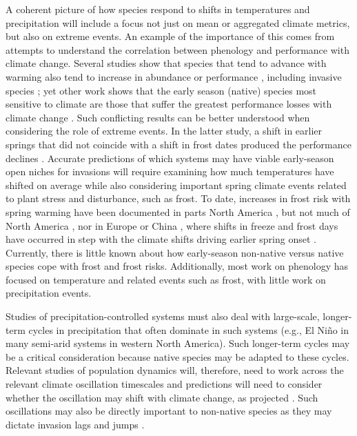 \documentclass[11pt,a4paper,oneside]{article}
\begin{document}
A coherent picture of how species respond to shifts in temperatures and precipitation will include a focus not just on mean or aggregated climate metrics, but also on extreme events. An example of the importance of this comes from attempts to understand the correlation between phenology and performance with climate change. Several studies show that species that tend to advance with warming also tend to increase in abundance or performance \citep{Cleland:2012vn}, including invasive species \citep{Willis:2010al,chuine2013}; yet other work shows that the early season (native) species most sensitive to climate are those that suffer the greatest performance losses with climate change \citep{Inouye:2008gj}. Such conflicting results can be better understood when considering the role of extreme events. In the latter study, a shift in earlier springs that did not coincide with a shift in frost dates produced the performance declines \citep{Inouye:2008gj}. Accurate predictions of which systems may have viable early-season open niches for invasions will require examining how much temperatures have shifted on average while also considering important spring climate events related to plant stress and disturbance, such as frost. To date, increases in frost risk with spring warming have been documented in parts North America \citep{Inouye:2008gj,gu2008,Augspurger2013}, but not much of North America \citep{Easterling:2000sa}, nor in Europe \citep{Menzel2003a,Scheifinger2003} or China \citep{Dai2013}, where shifts in freeze and frost days have occurred in step with the climate shifts driving earlier spring onset \citep{Dai2013}. Currently, there is little known about how early-season non-native versus native species cope with frost and frost risks. Additionally, most work on phenology has focused on temperature and related events such as frost, with little work on precipitation events.

Studies of precipitation-controlled systems must also deal with large-scale, longer-term cycles in precipitation that often dominate in such systems (e.g., El Ni\~{n}o in many semi-arid systems in western North America). Such longer-term cycles may be a critical consideration because native species may be adapted to these cycles. Relevant studies of population dynamics will, therefore, need to work across the relevant climate oscillation timescales and predictions will need to consider whether the oscillation may shift with climate change, as projected \citep{ipccPhys2007}. Such oscillations may also be directly important to non-native species as they may dictate invasion lags and jumps \citep{Salo:2005eo}. \\
\end{document}
